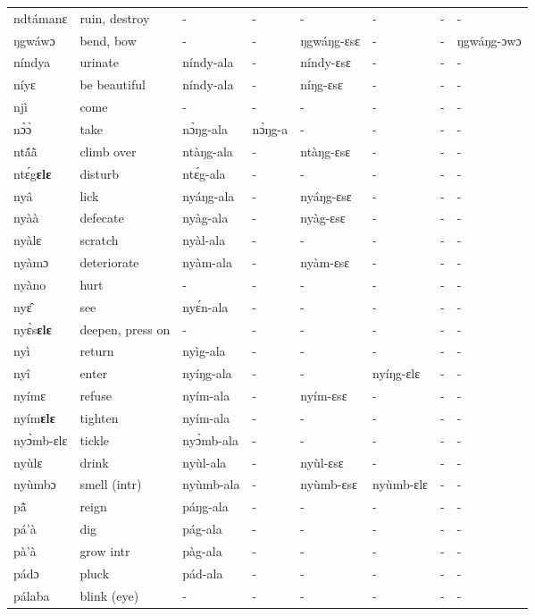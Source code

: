 \begin{sidewaystable}
\begin{longtable}{lp{3.5cm}llllll}
ndtámanɛ & ruin, destroy & - & - & - & - & - & - \\
ŋgwáwɔ & bend, bow & - & - & ŋgwáŋg-ɛsɛ & - & - & ŋgwáŋg-ɔwɔ \\  
níndya & urinate & níndy-ala & - & níndy-ɛsɛ & - &  - & - \\
níyɛ & be beautiful & níndy-ala & - & níŋg-ɛsɛ & - &  - & - \\
njì & come & - & - & - & - & - & - \\
nɔ̀ɔ̀ & take & nɔ̀ŋg-ala & nɔ̀ŋg-a & - & - & - & - \\
ntã́ã̀ & climb over & ntàŋg-ala & - & ntàŋg-ɛsɛ & - &  - & - \\
ntɛ́g{\bfseries ɛlɛ} & disturb & ntɛ́g-ala & - & - & - & - & - \\
nyâ & lick & nyáŋg-ala & - & nyáŋg-ɛsɛ & - &  - & - \\
nyàà & defecate & nyàg-ala & - & nyàg-ɛsɛ  & - &  - & - \\
nyàlɛ & scratch & nyàl-ala & - & - & -  & - &  - \\
nyàmɔ & deteriorate & nyàm-ala & - & nyàm-ɛsɛ & - & - & - \\
nyàno & hurt & - & - & - & - & - & - \\
nyɛ̂ & see & nyɛ́n-ala & - & - & -  & - & - \\
nyɛ̀s{\bfseries ɛlɛ} & deepen, press on & - & - & - & - & - & - \\
nyì & return & nyìg-ala & - & - & - & - & - \\
nyî & enter & nyíŋg-ala & - & - &  nyíŋg-ɛlɛ & - & - \\
nyímɛ & refuse & nyím-ala & - & nyím-ɛsɛ & - &  - & - \\
nyím{\bfseries ɛlɛ} & tighten & nyím-ala & - & - & - & - & - \\
nyɔ̀mb-ɛlɛ & tickle & nyɔ̀mb-ala & - & - & - & - & - \\
nyùlɛ & drink & nyùl-ala & - & nyùl-ɛsɛ & - &  - &  - \\
nyùmbɔ & smell (intr) & nyùmb-ala & - & nyùmb-ɛsɛ & nyùmb-ɛlɛ & - & - \\
pã̂ &  reign & páŋg-ala & - & - & - & - & - \\
pá'à & dig & pág-ala & - & - & - & - & - \\
pà'à & grow intr & pàg-ala & - & - & - & - & - \\
pádɔ & pluck & pád-ala & - & - & - & - & - \\
pálaba & blink (eye)  & - & - & - & - & - & - \\

\end{longtable}
\end{sidewaystable}
